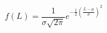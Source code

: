 \documentclass[10pt, a4paper]{article}
\begin{document}
$$f(L) = \frac{1}{\sigma\sqrt{2\pi}}e^{-\frac{1}{2}\left(\frac{L -\mu}{\sigma}\right)^2}$$
\end{document}
